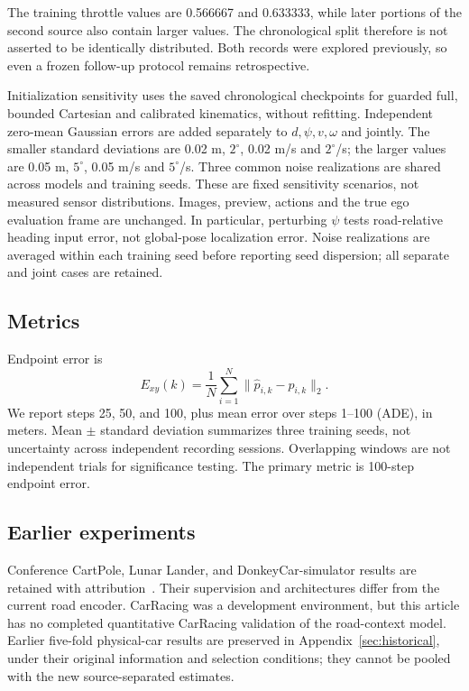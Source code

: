 \documentclass[preprint,12pt]{elsarticle}
\begin{document}
The training throttle values are 0.566667 and 0.633333, while later portions of
the second source also contain larger values. The chronological split therefore
is not asserted to be identically distributed. Both records were explored
previously, so even a frozen follow-up protocol remains retrospective.

Initialization sensitivity uses the saved chronological checkpoints for guarded
full, bounded Cartesian and calibrated kinematics, without refitting. Independent
zero-mean Gaussian errors are added separately to $d,\psi,v,\omega$ and jointly.
The smaller standard deviations are 0.02 m, $2^\circ$, 0.02 m/s and $2^\circ$/s;
the larger values are 0.05 m, $5^\circ$, 0.05 m/s and $5^\circ$/s. Three common
noise realizations are shared across models and training seeds. These are fixed
sensitivity scenarios, not measured sensor distributions. Images, preview,
actions and the true ego evaluation frame are unchanged. In particular,
perturbing $\psi$ tests road-relative heading input error, not global-pose
localization error. Noise realizations are averaged within each training seed
before reporting seed dispersion; all separate and joint cases are retained.

\subsection{Metrics}

Endpoint error is
\begin{equation}
 E_{xy}(k)=\frac1N\sum_{i=1}^{N}\|\hat p_{i,k}-p_{i,k}\|_2.\label{eq:metric_exy}
\end{equation}
We report steps 25, 50, and 100, plus mean error over steps 1--100 (ADE), in meters.
Mean $\pm$ standard deviation summarizes three training seeds, not uncertainty
across independent recording sessions. Overlapping windows are not independent
trials for significance testing. The primary metric is 100-step endpoint error.

\subsection{Earlier experiments}
Conference CartPole, Lunar Lander, and DonkeyCar-simulator results are retained
with attribution~\cite{piwm_conf}. Their supervision and architectures differ
from the current road encoder. CarRacing was a development environment, but this
article has no completed quantitative CarRacing validation of the road-context
model. Earlier five-fold physical-car results are preserved in
Appendix~\ref{sec:historical}, under their original information and selection
conditions; they cannot be pooled with the new source-separated estimates.
\end{document}
